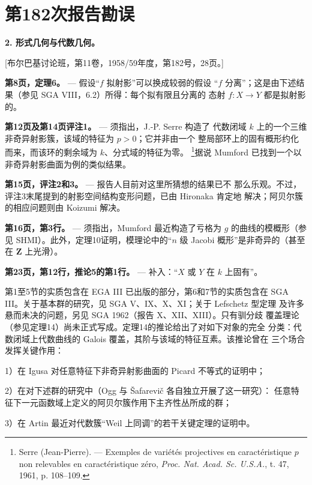 \clearpage
\chapter*{第182次报告勘误}
\setcounter{footnote}{1}

\noindent\textbf{2. 形式几何与代数几何。}

\begin{center}
[布尔巴基讨论班，第11卷，1958/59年度，第182号，28页。]
\end{center}

\noindent\textbf{第8页，定理6。} --- 假设“$f$ 拟射影”可以换成较弱的假设
“$f$ 分离”；这是由下述结果（参见 SGA VIII，6.2）所得：每个拟有限且分离的
态射 $f:X\longrightarrow Y$ 都是拟射影的。

\noindent\textbf{第12页及第14页评注1。} --- 须指出，J.-P. Serre 构造了
代数闭域 $k$ 上的一个三维非奇异射影簇，该域的特征为 $p>0$；它并非由一个
整局部环上的固有概形约化而来，而该环的剩余域为 $k$、分式域的特征为零。
\footnote{Serre (Jean-Pierre). --- Exemples de variétés projectives en
caractéristique $p$ non relevables en caractéristique zéro, \emph{Proc. Nat.
Acad. Sc. U.S.A.}, t. 47, 1961, p. 108--109.}据说 Mumford 已找到一个以
非奇异射影曲面为例的类似结果。

\noindent\textbf{第15页，评注2和3。} --- 报告人目前对这里所猜想的结果已不
那么乐观。不过，评注3末尾提到的射影空间结构变形问题，已由 Hironaka 肯定地
解决；阿贝尔簇的相应问题则由 Koizumi 解决。

\noindent\textbf{第16页，第3行。} --- 须指出，Mumford 最近构造了亏格为
$g$ 的曲线的模概形（参见 SHMI）。此外，定理10证明，模理论中的“$n$ 级
Jacobi 概形”是非奇异的（甚至在 $\mathbf Z$ 上光滑）。

\noindent\textbf{第23页，第12行，推论5的第1行。} --- 补入：“$X$ 或 $Y$
在 $k$ 上固有”。

第1至5节的实质包含在 EGA III 已出版的部分，第6和7节的实质包含在
SGA III。关于基本群的研究，见 SGA V、IX、X、XI；关于 Lefschetz 型定理
及许多悬而未决的问题，另见 SGA 1962（报告 X、XII、XIII）。只有驯分歧
覆盖理论（参见定理14）尚未正式写成。定理14的推论给出了对如下对象的完全
分类：代数闭域上代数曲线的 Galois 覆盖，其阶与该域的特征互素。该推论曾在
三个场合发挥关键作用：

1）在 Igusa 对任意特征下非奇异射影曲面的 Picard 不等式的证明中；

2）在对下述群的研究中（Ogg 与 Šafarevič 各自独立开展了这一研究）：
任意特征下一元函数域上定义的阿贝尔簇作用下主齐性丛所成的群；

3）在 Artin 最近对代数簇“Weil 上同调”的若干关键定理的证明中。

\par

